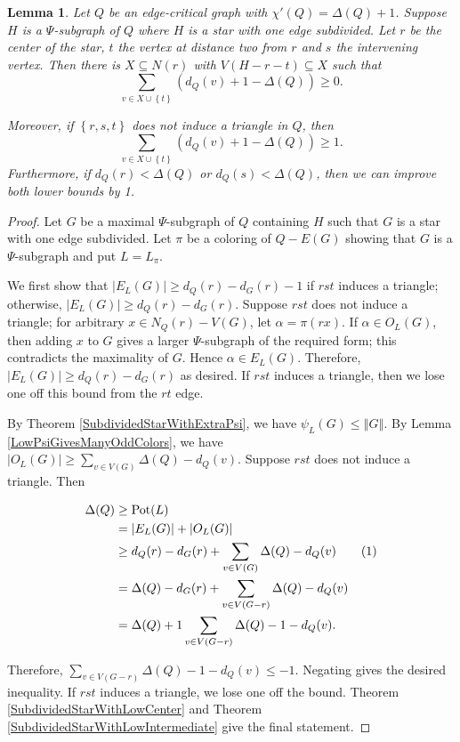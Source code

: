 \documentclass[12pt,reqno]{amsart}
\theoremstyle{plain}
\newtheorem{lem}[thm]{Lemma}
\theoremstyle{definition}
\theoremstyle{remark}
\newcommand{\set}[1]{\left\{ #1 \right\}}
\newcommand{\card}[1]{\left|#1\right|}
\newcommand{\size}[1]{\left\Vert#1\right\Vert}
\newcommand{\pot}{\operatorname{Pot}}
\newcommand\numberthis{\addtocounter{equation}{1}\tag{\theequation}}
\begin{document}
\begin{lem}\label{AdjacencyPrecursor}
Let $Q$ be an edge-critical graph with $\chi'(Q) = \Delta(Q) + 1$.  Suppose $H$ is a $\Psi$-subgraph of $Q$ where $H$ is a star with one edge subdivided.  Let $r$ be the center of the star, $t$ the vertex at distance two from $r$ and $s$ the intervening vertex. Then there is $X \subseteq N(r)$ with $V(H - r - t) \subseteq X$ such that 
\[\sum_{v \in X \cup \set{t}} (d_Q(v) + 1 - \Delta(Q)) \ge 0.\]  

\noindent Moreover, if $\set{r,s,t}$ does not induce a triangle in $Q$, then 
\[\sum_{v \in X \cup \set{t}} (d_Q(v) + 1 - \Delta(Q)) \ge 1.\]
Furthermore, if $d_Q(r)<\Delta(Q)$ or $d_Q(s)<\Delta(Q)$, then we can improve both lower bounds by 1.
\end{lem}
\begin{proof}
Let $G$ be a maximal $\Psi$-subgraph of $Q$ containing $H$ such that $G$ is a star with one edge subdivided.  Let $\pi$ be a coloring of $Q - E(G)$ showing that $G$ is a $\Psi$-subgraph and put $L = L_\pi$.  

We first show that $\card{E_{L}(G)} \ge d_Q(r) - d_G(r) - 1$ if $rst$ induces a triangle; otherwise, $\card{E_{L}(G)} \ge d_Q(r) - d_G(r)$.
Suppose $rst$ does not induce a triangle; for arbitrary $x \in N_Q(r) - V(G)$,
let $\alpha=\pi(rx)$.  If $\alpha \in O_{L}(G)$, then adding $x$ to $G$ gives a
larger $\Psi$-subgraph of the required form; this contradicts the maximality of
$G$.  Hence $\alpha \in E_{L}(G)$.  Therefore, $\card{E_{L}(G)} \ge d_Q(r) -
d_G(r)$ as desired.  If $rst$ induces a triangle, then we lose one off this
bound from the $rt$ edge.

By Theorem \ref{SubdividedStarWithExtraPsi}, we have $\psi_L(G) \le
\size{G}$.  By Lemma \ref{LowPsiGivesManyOddColors}, we have
$\card{O_{L}(G)} \ge \sum_{v \in V(G)} \Delta(Q) - d_Q(v)$.  Suppose $rst$ does not induce a triangle. Then

\begin{align*}
\Delta(Q) &\ge \pot(L)\\
&= \card{E_{L}(G)} + \card{O_{L}(G)}\\
&\ge d_Q(r) - d_G(r) + \sum_{v \in V(G)} \Delta(Q) - d_Q(v) \numberthis
\label{strict-ineq}\\
&= \Delta(Q) - d_G(r) + \sum_{v \in V(G - r)} \Delta(Q) - d_Q(v)\\
&= \Delta(Q) + 1 \sum_{v \in V(G - r)} \Delta(Q) - 1 - d_Q(v).
\end{align*}

Therefore, $\sum_{v \in V(G - r)} \Delta(Q) - 1 - d_Q(v) \le -1$.  Negating gives the desired inequality.  If $rst$ induces a triangle, we lose one off the bound.  Theorem \ref{SubdividedStarWithLowCenter} and Theorem \ref{SubdividedStarWithLowIntermediate} give the final statement.
\end{proof}
\end{document}
